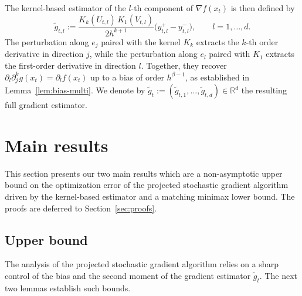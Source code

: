 \documentclass{article}
\renewcommand{\geq}{\geqslant}
\theoremstyle{definition}
\begin{document}
\medskip

The kernel-based estimator of the $l$-th component of 
$\nabla f(x_t)$ is then defined by
\begin{equation}
\label{eq:grad-estimator}
\tilde{g}_{t,l}
:=\frac{K_k(U_{t,l})\,K_1(V_{t,l})}{2h^{k+1}}
\bigl(y^+_{t,l}-y^-_{t,l}\bigr),\qquad l=1,\dots,d.
\end{equation}
The perturbation along $e_j$ paired with the kernel $K_k$ 
extracts the $k$-th order derivative in direction $j$, while the 
perturbation along $e_l$ paired with $K_1$ extracts the 
first-order derivative in direction $l$. Together, they recover 
$\partial_l\partial_j^k g(x_t)=\partial_l f(x_t)$ up to a bias of 
order $h^{\beta-1}$, as established in 
Lemma~\ref{lem:bias-multi}. We denote by 
$\tilde{g}_t:=(\tilde{g}_{t,1},\dots,\tilde{g}_{t,d})\in
\mathbb{R}^d$ the resulting full gradient estimator.




\section{Main results}
\label{sec:main}

This section presents our two main results which are a non-asymptotic upper 
bound on the optimization error of the projected stochastic gradient 
algorithm driven by the kernel-based estimator and a matching 
minimax lower bound. The proofs are deferred to 
Section~\ref{sec:proofs}.

\subsection{Upper bound}

The analysis of the projected stochastic gradient algorithm 
relies on a sharp control of the bias and the second moment of 
the gradient estimator $\tilde{g}_t$. The next two lemmas 
establish such bounds.
\end{document}
